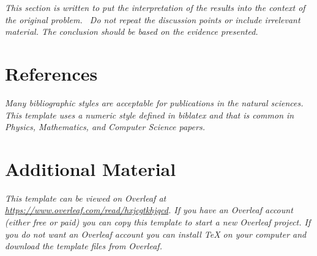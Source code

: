 \documentclass[11pt,a4paper,oneside]{report}
\newcommand{\instructions}[1]{{\color{orange}\itshape #1}}
\begin{document}
\instructions{This section is written to put the interpretation of the results
into the context of the original problem.~ Do not repeat the discussion
points or include irrelevant material. The conclusion should be based on
the evidence presented.}




\chapter*{References}
\label{references}


\instructions{Many bibliographic styles are acceptable for publications 
in the natural sciences. This template uses a numeric style defined in biblatex
and that is common in Physics, Mathematics, and Computer Science papers.}

\printbibliography[heading=none]


\appendix

\chapter{Additional Material}
\label{appendix-a}

\instructions{This template can be viewed on Overleaf at
\url{https://www.overleaf.com/read/hxjcgtkhjqcd}.  If you have an Overleaf
account (either free or paid) you can copy this template to start a new
Overleaf project.  If you do not want an Overleaf account you can install
TeX on your computer and download the template files from Overleaf.  }
\end{document}
